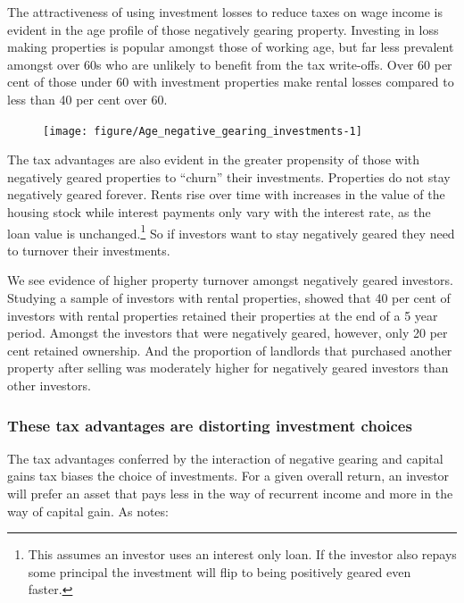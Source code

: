 \documentclass{grattan}\usepackage[]{graphicx}\usepackage[]{color}
\newcommand\gao{Grattan analysis of}
\begin{document}
The attractiveness of using investment losses to reduce taxes on wage income is evident in the age profile of those negatively gearing property. Investing in loss making properties is popular amongst those of working age, but far less prevalent amongst over 60s who are unlikely to benefit from the tax write-offs. Over 60 per cent of those under 60 with investment properties make rental losses compared to less than 40 per cent over 60.


\begin{figure}
\texttt{[image: figure/Age\_negative\_gearing\_investments-1]}

\source{\gao\ \textcite{ATO2013i}}
\end{figure}

The tax advantages are also evident in the greater propensity of those with negatively geared properties to ``churn'' their investments. Properties do not stay negatively geared forever. Rents rise over time with increases in the value of the housing stock while interest payments only vary with the interest rate, as the loan value is unchanged.\footnote{This assumes an investor uses an interest only loan. If the investor also repays some principal the investment will flip to being positively geared even faster.}  So if investors want to stay negatively geared they need to turnover their investments.

We see evidence of higher property turnover amongst negatively geared investors. Studying a sample of investors with rental properties, \textcite{Wood2010a} showed that 40 per cent of investors with rental properties retained their properties at the end of a 5 year period.  Amongst the investors that were negatively geared, however, only 20 per cent retained ownership.  And the proportion of landlords that purchased another property after selling was moderately higher for negatively geared investors than other investors.

\subsubsection{These tax advantages are distorting investment choices}
The tax advantages conferred by the interaction of negative gearing and capital gains tax biases the choice of investments. For a given overall return, an investor will prefer an asset that pays less in the way of recurrent income and more in the way of capital gain. As \textcite[p.~42]{RBA2014} notes:
\end{document}
